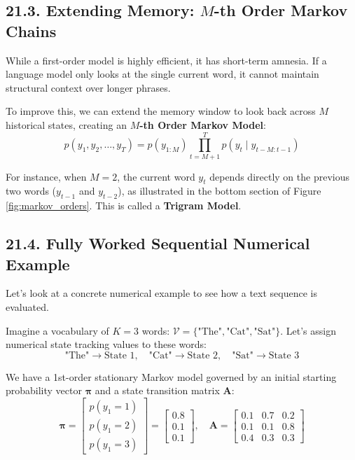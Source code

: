 \documentclass{article}
\begin{document}
\subsection*{21.3. Extending Memory: $M$-th Order Markov Chains}
While a first-order model is highly efficient, it has short-term amnesia. If a language model only looks at the single current word, it cannot maintain structural context over longer phrases. 

To improve this, we can extend the memory window to look back across $M$ historical states, creating an \textbf{$M$-th Order Markov Model}:
\begin{equation}
p(y_1, y_2, \dots, y_T) = p(y_{1:M}) \prod_{t=M+1}^T p(y_t \mid y_{t-M:t-1}) \tag{139}
\end{equation}

For instance, when $M=2$, the current word $y_t$ depends directly on the previous two words ($y_{t-1}$ and $y_{t-2}$), as illustrated in the bottom section of Figure \ref{fig:markov_orders}. This is called a \textbf{Trigram Model}. 

\subsection*{21.4. Fully Worked Sequential Numerical Example}

Let's look at a concrete numerical example to see how a text sequence is evaluated.

Imagine a vocabulary of $K=3$ words: $\mathcal{V} = \{\text{"The"}, \text{"Cat"}, \text{"Sat"}\}$. Let's assign numerical state tracking values to these words:
\begin{equation*}
\text{"The"} \to \text{State 1}, \quad \text{"Cat"} \to \text{State 2}, \quad \text{"Sat"} \to \text{State 3}
\end{equation*}

We have a 1st-order stationary Markov model governed by an initial starting probability vector $\boldsymbol{\pi}$ and a state transition matrix $\mathbf{A}$:
\begin{equation*}
\boldsymbol{\pi} = \begin{bmatrix} p(y_1=1) \\ p(y_1=2) \\ p(y_1=3) \end{bmatrix} = \begin{bmatrix} 0.8 \\ 0.1 \\ 0.1 \end{bmatrix}, \quad 
\mathbf{A} = \begin{bmatrix} 
0.1 & 0.7 & 0.2 \\ 
0.1 & 0.1 & 0.8 \\ 
0.4 & 0.3 & 0.3 
\end{bmatrix}
\end{equation*}
\end{document}
